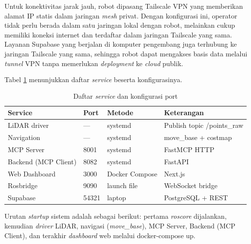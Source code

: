 Untuk konektivitas jarak jauh, robot dipasang Tailscale VPN yang memberikan alamat IP statis dalam jaringan \textit{mesh} privat. Dengan konfigurasi ini, operator tidak perlu berada dalam satu jaringan lokal dengan robot, melainkan cukup memiliki koneksi internet dan terdaftar dalam jaringan Tailscale yang sama. Layanan Supabase yang berjalan di komputer pengembang juga terhubung ke jaringan Tailscale yang sama, sehingga robot dapat mengakses basis data melalui \textit{tunnel} VPN tanpa memerlukan \textit{deployment} ke \textit{cloud} publik.

Tabel \ref{tab:services} menunjukkan daftar \textit{service} beserta konfigurasinya.

\begin{table}[H]
\centering
\caption{Daftar \textit{service} dan konfigurasi port}
\label{tab:services}
\begin{tabular}{|l|l|l|l|}
\hline
\textbf{Service} & \textbf{Port} & \textbf{Metode} & \textbf{Keterangan} \\ \hline
LiDAR driver & — & systemd & Publish topic /points\_raw \\ \hline
Navigation & — & systemd & move\_base + costmap \\ \hline
MCP Server & 8001 & systemd & FastMCP HTTP \\ \hline
Backend (MCP Client) & 8082 & systemd & FastAPI \\ \hline
Web Dashboard & 3000 & Docker Compose & Next.js \\ \hline
Rosbridge & 9090 & launch file & WebSocket bridge \\ \hline
Supabase & 54321 & laptop & PostgreSQL + REST \\ \hline
\end{tabular}
\end{table}

Urutan \textit{startup} sistem adalah sebagai berikut: pertama \textit{roscore} dijalankan, kemudian \textit{driver} LiDAR, navigasi (\textit{move\_base}), MCP Server, Backend (MCP Client), dan terakhir \textit{dashboard} web melalui docker-compose up.

